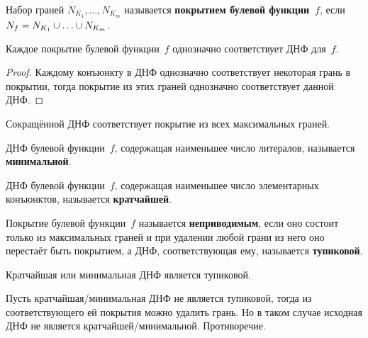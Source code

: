  Набор граней $N_{K_1}, \ldots, N_{K_m}$ называется \textbf{покрытием булевой функции~$f$}, если $N_f = N_{K_1} \opbr\cup \ldots \opbr\cup N_{K_m}$.

\begin{statement}
Каждое покрытие булевой функции~$f$ однозначно соответствует ДНФ для~$f$.
\end{statement}
\begin{proof}
Каждому конъюнкту в ДНФ однозначно соответствует некоторая грань в покрытии, тогда покрытие из этих граней однозначно соответствует данной ДНФ.
\end{proof}

\begin{consequent}
Сокращённой ДНФ соответствует покрытие из всех максимальных граней.
\end{consequent}

ДНФ булевой функции~$f$, содержащая наименьшее число литералов, называется \textbf{минимальной}.

ДНФ булевой функции~$f$, содержащая наименьшее число элементарных конъюнктов, называется \textbf{кратчайшей}.

Покрытие булевой функции~$f$ называется \textbf{неприводимым}, если оно состоит только из максимальных граней и при удалении любой грани из него оно перестаёт быть покрытием, а ДНФ, соответствующая ему, называется \textbf{тупиковой}.

\begin{statement}
Кратчайшая или минимальная ДНФ является тупиковой.
\end{statement}
\begin{proofcontra}
Пусть кратчайшая/минимальная ДНФ не является тупиковой, тогда из соответствующего ей покрытия можно удалить грань.
Но в таком случае исходная ДНФ не является кратчайшей/минимальной.
Противоречие.
\end{proofcontra}